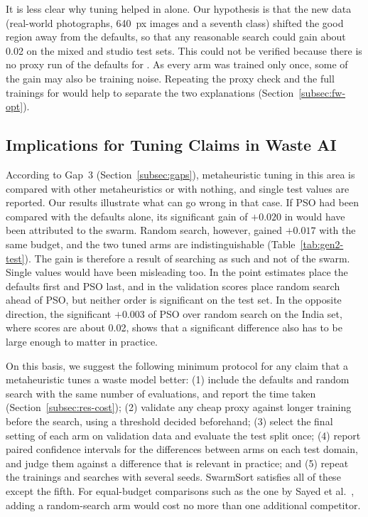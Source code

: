 It is less clear why tuning helped in \gentwo alone. Our hypothesis is that the new data (real-world photographs, 640~px images and a seventh class) shifted the good region away from the defaults, so that any reasonable search could gain about 0.02 \mapfifty on the mixed and studio test sets. This could not be verified because there is no proxy run of the defaults for \gentwo. As every arm was trained only once, some of the gain may also be training noise. Repeating the proxy check and the full trainings for \gentwo would help to separate the two explanations (Section~\ref{subsec:fw-opt}).

\subsection{Implications for Tuning Claims in Waste AI}
\label{subsec:implications}

According to Gap~3 (Section~\ref{subsec:gaps}), metaheuristic tuning in this area is compared with other metaheuristics or with nothing, and single test values are reported. Our results illustrate what can go wrong in that case. If PSO had been compared with the defaults alone, its significant gain of $+0.020$ \mapfifty in \gentwo would have been attributed to the swarm. Random search, however, gained $+0.017$ with the same budget, and the two tuned arms are indistinguishable (Table~\ref{tab:gen2-test}). The gain is therefore a result of searching as such and not of the swarm. Single values would have been misleading too. In \genone the point estimates place the defaults first and PSO last, and in \gentwo the validation scores place random search ahead of PSO, but neither order is significant on the test set. In the opposite direction, the significant $+0.003$ of PSO over random search on the India set, where scores are about 0.02, shows that a significant difference also has to be large enough to matter in practice.

On this basis, we suggest the following minimum protocol for any claim that a metaheuristic tunes a waste model better: (1) include the defaults and random search with the same number of evaluations, and report the time taken (Section~\ref{subsec:res-cost}); (2) validate any cheap proxy against longer training before the search, using a threshold decided beforehand; (3) select the final setting of each arm on validation data and evaluate the test split once; (4) report paired confidence intervals for the differences between arms on each test domain, and judge them against a difference that is relevant in practice; and (5) repeat the trainings and searches with several seeds. SwarmSort satisfies all of these except the fifth. For equal-budget comparisons such as the one by Sayed et al.~\cite{sayed2024intelligent}, adding a random-search arm would cost no more than one additional competitor.

